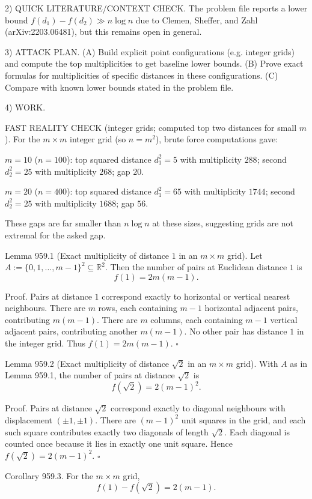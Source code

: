 2) QUICK LITERATURE/CONTEXT CHECK.
The problem file reports a lower bound $f(d_1)-f(d_2)\gg n\log n$ due to Clemen, Sheffer, and Zahl (arXiv:2203.06481), but this remains open in general.

3) ATTACK PLAN.
(A) Build explicit point configurations (e.g. integer grids) and compute the top multiplicities to get baseline lower bounds.
(B) Prove exact formulas for multiplicities of specific distances in these configurations.
(C) Compare with known lower bounds stated in the problem file.

4) WORK.

FAST REALITY CHECK (integer grids; computed top two distances for small $m$).
For the $m\times m$ integer grid (so $n=m^2$), brute force computations gave:

$m=10$ ($n=100$): top squared distance $d_1^2=5$ with multiplicity $288$; second $d_2^2=25$ with multiplicity $268$; gap $20$.

$m=20$ ($n=400$): top squared distance $d_1^2=65$ with multiplicity $1744$; second $d_2^2=25$ with multiplicity $1688$; gap $56$.

These gaps are far smaller than $n\log n$ at these sizes, suggesting grids are not extremal for the asked gap.

Lemma 959.1 (Exact multiplicity of distance $1$ in an $m\times m$ grid).
Let
$A:=\{0,1,\dots,m-1\}^2\subseteq\mathbb{R}^2$.
Then the number of pairs at Euclidean distance $1$ is
\[
 f(1)=2m(m-1).
\]

Proof.
Pairs at distance $1$ correspond exactly to horizontal or vertical nearest neighbours.
There are $m$ rows, each containing $m-1$ horizontal adjacent pairs, contributing $m(m-1)$.
There are $m$ columns, each containing $m-1$ vertical adjacent pairs, contributing another $m(m-1)$.
No other pair has distance $1$ in the integer grid.
Thus $f(1)=2m(m-1)$.
\hfill $\square$

Lemma 959.2 (Exact multiplicity of distance $\sqrt{2}$ in an $m\times m$ grid).
With $A$ as in Lemma 959.1, the number of pairs at distance $\sqrt{2}$ is
\[
 f(\sqrt{2})=2(m-1)^2.
\]

Proof.
Pairs at distance $\sqrt{2}$ correspond exactly to diagonal neighbours with displacement $(\pm 1,\pm 1)$.
There are $(m-1)^2$ unit squares in the grid, and each such square contributes exactly two diagonals of length $\sqrt{2}$.
Each diagonal is counted once because it lies in exactly one unit square.
Hence $f(\sqrt{2})=2(m-1)^2$.
\hfill $\square$

Corollary 959.3.
For the $m\times m$ grid,
\[
 f(1)-f(\sqrt{2})=2(m-1).
\]

